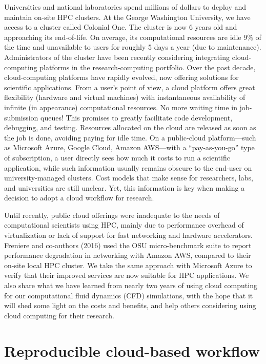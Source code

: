\documentclass[10pt,journal,compsoc]{IEEEtran}
\begin{document}
Universities and national laboratories spend millions of dollars to deploy and maintain on-site HPC clusters.
At the George Washington University, we have access to a cluster called Colonial One.
The cluster is now $6$ years old and approaching its end-of-life.
On average, its computational resources are idle $9\%$ of the time and unavailable to users for roughly 5 days a year (due to maintenance).
Administrators of the cluster have been recently considering integrating cloud-computing platforms in the research-computing portfolio. 
Over the past decade, cloud-computing platforms have rapidly evolved, now offering solutions for scientific applications.
From a user's point of view, a cloud platform offers great flexibility (hardware and virtual machines) with instantaneous availability of infinite (in appearance) computational resources.
No more waiting time in job-submission queues!
This promises to greatly facilitate code development, debugging, and testing. Resources allocated on the cloud are released as soon as the job is done, avoiding paying for idle time.
On a public-cloud platform---such as Microsoft Azure, Google Cloud, Amazon AWS---with a ``pay-as-you-go'' type of subscription, a user directly sees how much it costs to run a scientific application, while such information usually remains obscure to the end-user on university-managed clusters. 
Cost models that make sense for researchers, labs, and universities are still unclear. 
Yet, this information is key when making a decision to adopt a cloud workflow for research. 

Until recently, public cloud offerings were inadequate to the needs of computational scientists using HPC, mainly due to performance overhead of virtualization or lack of support for fast networking \cite{freniere_et_2016} and hardware accelerators.
Freniere and co-authors (2016) used the OSU micro-benchmark suite to report performance degradation in networking with Amazon AWS, compared to their on-site local HPC cluster.
We take the same approach with Microsoft Azure to verify that their improved services are now suitable for HPC applications.
We also share what we have learned from nearly two years of using cloud computing for our computational fluid dynamics (CFD) simulations, with the hope that it will shed some light on the costs and benefits, and help others considering using cloud computing for their research.

\section{Reproducible cloud-based workflow}\label{sec:workflow}
\end{document}
